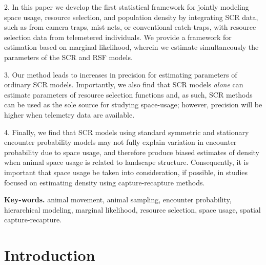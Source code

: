 \documentclass[12pt]{article}
\begin{document}
2. In this paper we develop the first statistical framework for
jointly modeling space usage, resource selection, and population
density by integrating SCR data, such as from camera traps, mist-nets, or
conventional catch-traps, with resource selection data from telemetered individuals.
We provide a framework for estimation based on marginal
likelihood, wherein we estimate simultaneously the parameters of the
SCR and RSF models.

3.
Our method leads to increases in precision
for estimating %
parameters of ordinary
SCR models.  Importantly, we also find that SCR models {\it alone} can
estimate parameters of resource selection functions and, as such, SCR
methods can be used as the sole source for studying space-usage;
however, precision will be higher when telemetry data are available.

4. Finally, we find that SCR
models using standard symmetric and stationary encounter probability
models may not fully explain variation in encounter probability due to
space usage, and therefore produce biased estimates of density when animal space
usage is related to landscape structure. Consequently, it is
important that space usage be taken into consideration, if
possible, in studies focused on estimating density using
capture-recapture methods.

\vspace{.2in}

{\bf Key-words. }
animal movement, animal sampling, encounter
probability, hierarchical modeling,
marginal likelihood,
resource selection, space usage,  spatial capture-recapture. \\


\section{Introduction}
\end{document}

